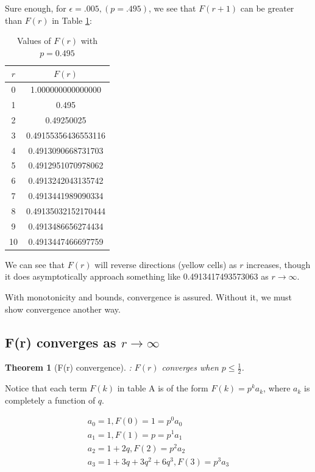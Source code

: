 \documentclass[11pt, oneside]{article} 	%
\newtheorem{theorem}{Theorem}[section]
\begin{document}
Sure enough, for $\epsilon = .005, (p = .495)$, we see that $F(r+1)$ can be greater than $F(r)$ in Table  \ref{tab:p_values_epsilon}:


\begin{table}[h]
\centering
\begin{tabular}{|c|c|}
\hline
$r$ & $F(r)$ \\
\hline
0 & 1.000000000000000 \\
1 & 0.495 \\
2 & 0.49250025 \\
3 & 0.49155356436553116 \\
4 & 0.4913090668731703 \\
5 & \cellcolor{yellow}0.4912951070978062 \\
6 & 0.4913242043135742 \\
7 & 0.4913441989090334 \\
8 & \cellcolor{yellow}0.49135032152170444 \\
9 & 0.4913486656274434 \\
10 & 0.4913447466697759 \\
\hline
\end{tabular}
\caption{Values of $F(r)$ with $p=0.495$}
\label{tab:p_values_epsilon}
\end{table}


We can see that $F(r)$ will reverse directions (yellow cells) as $r$ increases, though it does asymptotically approach something like 0.4913417493573063 as $r \rightarrow \infty$.

With monotonicity and bounds, convergence is assured.  Without it, we must show convergence another way.

\subsection{F(r) converges as $r \rightarrow \infty$}

\begin{theorem}[F(r) convergence]: $F(r)$ converges when $p \leq \frac1{2}$.\end{theorem}

Notice that each term $F(k)$ in table A is of the form $F(k) = p^k a_k$, where $a_k$ is completely a function of $q$.

\begin{align}
a_0 = 1, F(0) = 1 = p^0a_0 \\
a_1 = 1, F(1) = p = p^1a_1\\
a_2 = 1+2q, F(2) = p^2a_2 \\
a_3 = 1+3q+3q^2+6q^3, F(3) = p^3a_3
\end{align}
\end{document}
